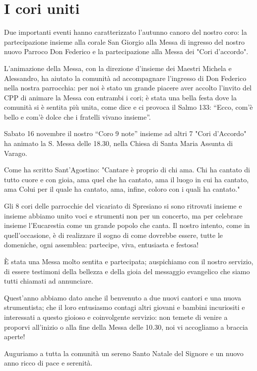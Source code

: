 \section{I cori uniti}

Due importanti eventi hanno caratterizzato l'autunno canoro del nostro coro: la partecipazione insieme alla corale San Giorgio alla Messa di ingresso del nostro nuovo Parroco Don Federico e la partecipazione alla Messa dei "Cori d'accordo".

L'animazione della Messa, con la direzione d'insieme dei Maestri Michela e Alessandro, ha aiutato la comunità ad accompagnare l'ingresso di Don Federico nella nostra parrocchia: per noi è stato un grande piacere aver accolto l'invito del CPP di animare la Messa con entrambi i cori; è stata una bella festa dove la comunità si è sentita più unita, come dice e ci provoca il Salmo 133: “Ecco, com’è bello e com’è dolce che i fratelli vivano insieme”.

Sabato 16 novembre il nostro “Coro 9 note” insieme ad altri 7 "Cori d'Accordo" ha animato la S. Messa delle 18.30, nella Chiesa di Santa Maria Assunta di Varago.


Come ha scritto Sant’Agostino:
"Cantare è proprio di chi ama. Chi ha cantato di tutto cuore e con gioia, ama quel che ha cantato, ama il luogo in cui ha cantato, ama Colui per il quale ha cantato, ama, infine, coloro con i quali ha cantato."

Gli 8 cori delle parrocchie del vicariato di Spresiano si sono ritrovati insieme e insieme abbiamo unito voci e strumenti non per un concerto, ma per celebrare insieme l’Eucarestia come un grande popolo che canta.
Il nostro intento, come in quell'occasione, è di realizzare il sogno di come dovrebbe essere, tutte le domeniche, ogni assemblea: partecipe, viva, entusiasta e festosa!



È stata una Messa molto sentita e partecipata; auspichiamo con il nostro servizio, di essere testimoni della bellezza e della gioia del messaggio evangelico che siamo tutti chiamati ad annunciare.

Quest'anno abbiamo dato anche il benvenuto a due nuovi cantori e una nuova strumentista; che il loro entusiasmo contagi altri giovani e bambini incuriositi e interessati a questo gioioso e coinvolgente servizio: non temete di venire a proporvi all'inizio o alla fine della Messa delle 10.30, noi vi accogliamo a braccia aperte!

Auguriamo a tutta la comunità un sereno Santo Natale del Signore e un nuovo anno ricco di pace e serenità.




